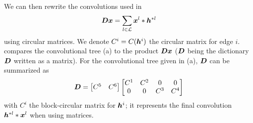 We can then rewrite the convolutions used in
\begin{equation*}\bm{D}\bm{x} = \sum_{l \in \mathcal L} \bm{x}^l * \bm{h}^{*l}\end{equation*}
using circular matrices. We denote $C^i = C(\bm{h}^i)$ the circular matrix for edge $i$.  compares the convolutional tree (a) to the product $\bm{D}\bm{x}$ ($\bm{D}$ being the dictionary $\bm{D}$ written as a matrix). For the convolutional tree given in (a), $\bm{D}$ can be summarized as
\begin{align}
\bm{D} = \begin{bmatrix}C^5 & C^6\end{bmatrix} \begin{bmatrix}C^1 & C^2 & 0 & 0 \\0 & 0 & C^3 & C^4\end{bmatrix}\label{eq_matrix_developed}
\end{align}
with $C^i$ the block-circular matrix for $\bm{h}^i$; it represents the final convolution $\bm{h}^{*l}*\bm{x}^l$ when using matrices.

